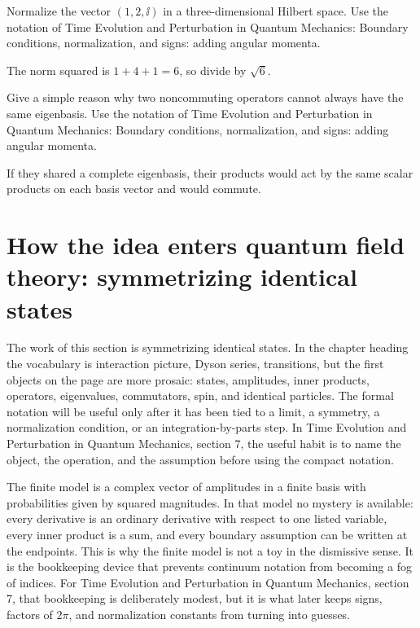 \begin{exercise}
Normalize the vector \((1,2,\ii)\) in a three-dimensional Hilbert space.  Use the notation of Time Evolution and Perturbation in Quantum Mechanics: Boundary conditions, normalization, and signs: adding angular momenta.
\begin{answer}
The norm squared is \(1+4+1=6\), so divide by \(\sqrt6\).
\end{answer}
\end{exercise}

\begin{exercise}
Give a simple reason why two noncommuting operators cannot always have the same eigenbasis.  Use the notation of Time Evolution and Perturbation in Quantum Mechanics: Boundary conditions, normalization, and signs: adding angular momenta.
\begin{answer}
If they shared a complete eigenbasis, their products would act by the same scalar products on each basis vector and would commute.
\end{answer}
\end{exercise}



\section{How the idea enters quantum field theory: symmetrizing identical states}

The work of this section is symmetrizing identical states.  In the chapter heading the vocabulary is interaction picture, Dyson series, transitions, but the first objects on the page are more prosaic: states, amplitudes, inner products, operators, eigenvalues, commutators, spin, and identical particles.  The formal notation will be useful only after it has been tied to a limit, a symmetry, a normalization condition, or an integration-by-parts step.  In Time Evolution and Perturbation in Quantum Mechanics, section 7, the useful habit is to name the object, the operation, and the assumption before using the compact notation.

The finite model is a complex vector of amplitudes in a finite basis with probabilities given by squared magnitudes.  In that model no mystery is available: every derivative is an ordinary derivative with respect to one listed variable, every inner product is a sum, and every boundary assumption can be written at the endpoints.  This is why the finite model is not a toy in the dismissive sense.  It is the bookkeeping device that prevents continuum notation from becoming a fog of indices.  For Time Evolution and Perturbation in Quantum Mechanics, section 7, that bookkeeping is deliberately modest, but it is what later keeps signs, factors of \(2\pi\), and normalization constants from turning into guesses.

